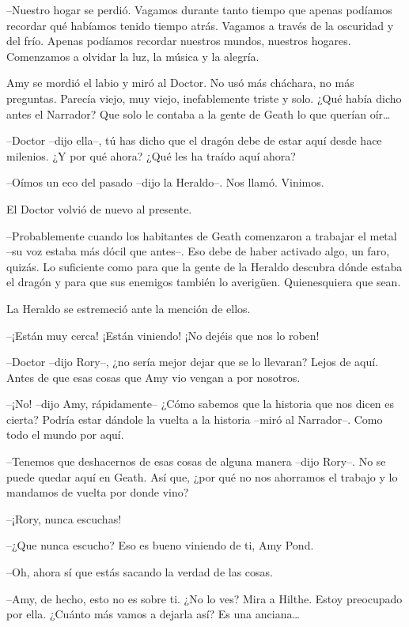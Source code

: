 {--Nuestro hogar se perdió. Vagamos durante tanto tiempo que apenas
	podíamos recordar qué habíamos tenido tiempo atrás. Vagamos a través de
	la oscuridad y del frío. Apenas podíamos recordar nuestros mundos,
nuestros hogares. Comenzamos a olvidar la luz, la música y la alegría.}

{Amy se mordió el labio y miró al Doctor. No usó más cháchara, no más
	preguntas. Parecía viejo, muy viejo, inefablemente triste y solo. ¿Qué
	había dicho antes el Narrador? Que solo le contaba a la gente de Geath
	lo que querían oír\ldots{}}

{--Doctor --dijo ella--, tú has dicho que el dragón debe de estar aquí
desde hace milenios. ¿Y por qué ahora? ¿Qué les ha traído aquí ahora?}

{--Oímos un eco del pasado --dijo la Heraldo--. Nos llamó. Vinimos.}

{El Doctor volvió de nuevo al presente.}

{--Probablemente cuando los habitantes de Geath comenzaron a trabajar
	el metal --su voz estaba más dócil que antes--. Eso debe de haber
	activado algo, un faro, quizás. Lo suficiente como para que la gente de
	la Heraldo descubra dónde estaba el dragón y para que sus enemigos
también lo averigüen. Quienesquiera que sean.}

{La Heraldo se estremeció ante la mención de ellos.}

{--¡Están muy cerca! ¡Están viniendo! ¡No dejéis que nos lo roben!}

{--Doctor --dijo Rory--, ¿no sería mejor dejar que se lo llevaran?
	Lejos de aquí. Antes de que esas cosas que Amy vio vengan a por
nosotros.}

{--¡No! --dijo Amy, rápidamente-- ¿Cómo sabemos que la historia que
	nos dicen es cierta? Podría estar dándole la vuelta a la historia --miró
al Narrador--. Como todo el mundo por aquí.}

{--Tenemos que deshacernos de esas cosas de alguna manera --dijo
	Rory--. No se puede quedar aquí en Geath. Así que, ¿por qué no nos
ahorramos el trabajo y lo mandamos de vuelta por donde vino?}

{--¡Rory, nunca escuchas!}

{--¿Que nunca escucho? Eso es bueno viniendo de ti, Amy Pond.}

{--Oh, ahora sí que estás sacando la verdad de las cosas.}

{--Amy, de hecho, esto no es sobre ti. ¿No lo ves? Mira a Hilthe.
	Estoy preocupado por ella. ¿Cuánto más vamos a dejarla así? Es una
	anciana\ldots{}}

